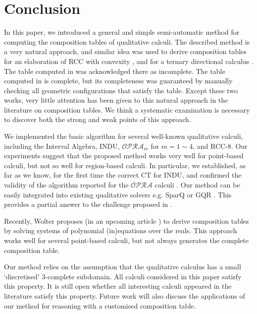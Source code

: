 \documentclass{llncs}
\newcommand{\opra}{\mathcal{OPRA}}
\begin{document}
\section{Conclusion}
In this paper, we introduced a general and simple semi-automatic method for computing the composition tables of qualitative calculi. The described method is a very natural approach, and similar idea was used to derive composition tables for an elaboration of RCC with convexity \cite{Cohn+93}, and for a ternary directional calculus \cite{Clementini+10}. The table computed in \cite{Cohn+93} was acknowledged there as incomplete. The table computed in \cite{Clementini+10} is complete, but its completeness was guaranteed by manually checking all geometric configurations that satisfy the table.  Except these two works, very little attention has been given to this natural approach in the literature on composition tables. We think a systematic examination is necessary to discover both the strong and weak points of this approach.

We implemented the basic algorithm for several well-known qualitative calculi, including the Interval Algebra, INDU, $\opra_m$ for $m=1\sim 4$, and RCC-8. Our experiments suggest that the proposed method works very well for point-based calculi, but not so well for region-based calculi. In particular, we established, as far as we know, for the first time the correct CT for INDU, and confirmed the validity of the algorithm reported for the $\opra$ calculi \cite{MM10}. Our method can be easily integrated into existing qualitative solvers e.g. SparQ \cite{WallgrunFWDF06} or GQR \cite{WestphalWG09}. This provides a partial answer to the challenge proposed in \cite{Cohn95}.

Recently, Wolter proposes (in an upcoming article \cite{Wolter11}) to derive composition tables by solving systems of polynomial (in)equations over the reals. This approach works well for several point-based calculi, but not always generates the complete composition table.  

Our method relies on the assumption that the qualitative calculus has a small `discretised' 3-complete subdomain. All calculi considered in this paper satisfy this property. It is still open whether all interesting calculi appeared in the literature satisfy this property. Future work will also discuss the applications of our method for reasoning with a customised composition table.



\end{document}
